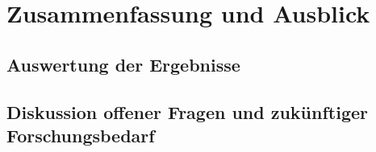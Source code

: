 
\chapter{Zusammenfassung und Ausblick}

\section{Auswertung der Ergebnisse}
\section{Diskussion offener Fragen und zukünftiger Forschungsbedarf}